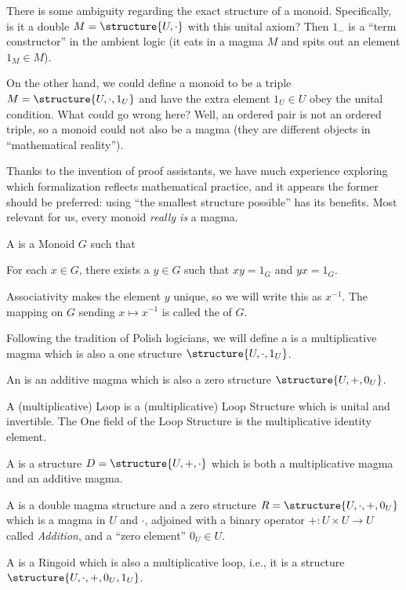 \begin{remark}
There is some ambiguity regarding the exact structure of a
monoid. Specifically, is it a double $M=\structure{U,\cdot}$ with this
unital axiom? Then $1_{-}$ is a ``term constructor'' in the ambient
logic (it eats in a magma $M$ and spits out an element $1_{M}\in M$).

On the other hand, we could define a monoid to be a triple
$M=\structure{U,\cdot,1_{U}}$ and have the extra element $1_{U}\in U$ obey the
unital condition. What could go wrong here? Well, an ordered pair is
not an ordered triple, so a monoid could not also be a magma (they are
different objects in ``mathematical reality'').

Thanks to the invention of proof assistants, we have much experience
exploring which formalization reflects mathematical practice, and it
appears the former should be preferred: using ``the smallest structure possible''
has its benefits. Most relevant for us, every monoid \emph{really is}
a magma.
\end{remark}

\begin{definition}
A  is a Monoid $G$ such that
\begin{itemize}
 For each $x\in G$, there exists a $y\in G$
  such that $xy=1_{G}$ and $yx=1_{G}$.
\end{itemize}
Associativity makes the element $y$ unique, so we will write this as
$x^{-1}$. The mapping on $G$ sending $x\mapsto x^{-1}$ is called the
 of $G$.
\end{definition}

\begin{definition}
Following the tradition of Polish logicians, we will define a
 is a multiplicative magma which
is also a one structure $\structure{U,\cdot,1_{U}}$.

An  is an additive magma which is also a zero
structure $\structure{U,+,0_{U}}$.

A (multiplicative) Loop is a (multiplicative) Loop Structure which is
unital and invertible. The One field of the Loop Structure is the
multiplicative identity element.
\end{definition}

\begin{definition}
A  is a structure $D=\structure{U,+,\cdot}$
which is both a multiplicative magma and an additive magma.

A  
is a double magma structure and a zero structure $R=\structure{U,\cdot,+,0_{U}}$ which is
a magma in $U$ and $\cdot$, adjoined with a binary operator $+\colon U\times U\to U$
called \emph{Addition},
and a ``zero element'' $0_{U}\in U$.

A  is a Ringoid which is also a multiplicative
loop, i.e., it is a structure $\structure{U,\cdot,+,0_{U},1_{U}}$. 
\end{definition}

